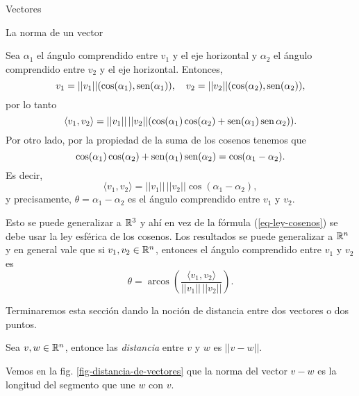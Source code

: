 \begin{chapter}{Vectores}
\begin{section}{La norma de un vector}
        
        Sea $\alpha_1$ el ángulo comprendido  entre $v_1$ y el eje horizontal y $\alpha_2$ el ángulo comprendido  entre $v_2$ y el eje horizontal.  Entonces,
        \begin{equation*}
        v_1 = ||v_1||(\cos (\alpha_1), \operatorname{sen}(\alpha_1) ), \quad v_2 = ||v_2||(\cos (\alpha_2), \operatorname{sen}(\alpha_2) ),
        \end{equation*}
        por lo tanto
        \begin{equation*}
        \langle v_1 , v_2 \rangle =  ||v_1|| \,  ||v_2|| (\cos (\alpha_1)\cos(\alpha_2)+  \operatorname{sen}(\alpha_1)\operatorname{sen}\alpha_2)). 
        \end{equation*}
        Por otro  lado, por la propiedad de la suma de los cosenos tenemos que 
        \begin{equation}\label{eq-ley-cosenos}
        \cos (\alpha_1)\cos(\alpha_2)+  \operatorname{sen}(\alpha_1)\operatorname{sen}(\alpha_2) = \cos(\alpha_1- \alpha_2).
        \end{equation}
        Es decir, 
        \begin{equation*}
        \langle v_1,v_2 \rangle =   ||v_1|| \,  ||v_2|| \cos (\alpha_1-\alpha_2), 
        \end{equation*}
        y precisamente, $\theta =  \alpha_1-\alpha_2$ es el ángulo comprendido entre  $v_1$ y $v_2$.
        
        Esto se puede generalizar a $\mathbb R^3$  y ahí en vez de la fórmula (\ref{eq-ley-cosenos}) se debe usar la ley esférica de los cosenos. Los resultados se puede generalizar a  $\mathbb R^n$ y  en general vale  que si $v_1, v_2 \in \mathbb R^n$,  entonces el ángulo comprendido entre $v_1$ y $v_2$ es 
        \begin{equation}\label{eq-ang-comprendido}
        \theta = 	\operatorname{arcos}\left(\frac{\langle v_1 , v_2 \rangle}{||v_1|| \,  ||v_2|| }\right).
        \end{equation}  
        
        
        Terminaremos esta sección dando la noción de  distancia entre dos vectores o dos puntos. 
        
        \begin{definicion}
            Sea $v,w \in \mathbb R^n$, entonce las \textit{distancia} entre $v$ y $w$ es $||v-w||$.
        \end{definicion}
    
    Vemos en la fig. \ref{fig-distancia-de-vectores} que la norma del vector $v-w$ es la longitud del segmento que une $w$ con $v$.


\end{section}
\end{chapter}

